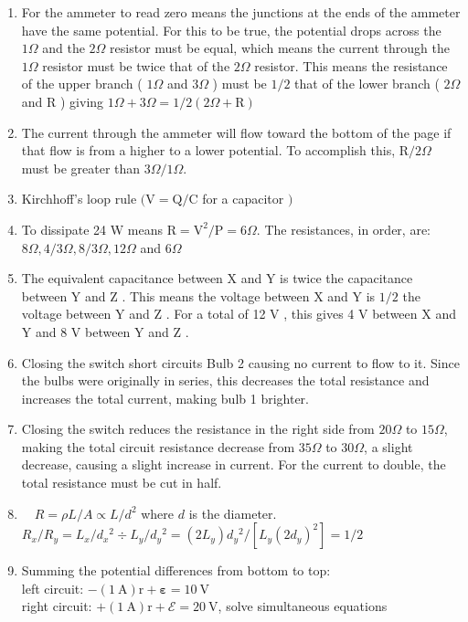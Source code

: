\begin{enumerate}
\begin{enumerate}
  \item For the ammeter to read zero means the junctions at the ends of the ammeter have the same potential. For this to be true, the potential drops across the $1 \Omega$ and the $2 \Omega$ resistor must be equal, which means the current through the $1 \Omega$ resistor must be twice that of the $2 \Omega$ resistor. This means the resistance of the upper branch ( $1 \Omega$ and $3 \Omega$ ) must be $1 / 2$ that of the lower branch ( $2 \Omega$ and R ) giving $1 \Omega+3 \Omega=1 / 2(2 \Omega+\mathrm{R})$
  \item The current through the ammeter will flow toward the bottom of the page if that flow is from a higher to a lower potential. To accomplish this, $\mathrm{R} / 2 \Omega$ must be greater than $3 \Omega / 1 \Omega$.
  \item Kirchhoff's loop rule $(\mathrm{V}=\mathrm{Q} / \mathrm{C}$ for a capacitor $)$
  \item To dissipate 24 W means $\mathrm{R}=\mathrm{V}^{2} / \mathrm{P}=6 \Omega$. The resistances, in order, are: $8 \Omega, 4 / 3 \Omega, 8 / 3 \Omega, 12 \Omega$ and $6 \Omega$
  \item The equivalent capacitance between X and Y is twice the capacitance between Y and Z . This means the voltage between X and Y is $1 / 2$ the voltage between Y and Z . For a total of 12 V , this gives 4 V between X and Y and 8 V between Y and Z .
  \item Closing the switch short circuits Bulb 2 causing no current to flow to it. Since the bulbs were originally in series, this decreases the total resistance and increases the total current, making bulb 1 brighter.
  \item Closing the switch reduces the resistance in the right side from $20 \Omega$ to $15 \Omega$, making the total circuit resistance decrease from $35 \Omega$ to $30 \Omega$, a slight decrease, causing a slight increase in current. For the current to double, the total resistance must be cut in half.
  \item $\quad R=\rho L / A \propto L / d^{2}$ where $d$ is the diameter. $R_{x} / R_{y}=L_{x} / d_{x}{ }^{2} \div L_{y} / d_{y}{ }^{2}=\left(2 L_{y}\right) d_{y}{ }^{2} /\left[L_{y}\left(2 d_{y}\right)^{2}\right]=1 / 2$
  \item Summing the potential differences from bottom to top:\\
left circuit: $-(1 \mathrm{~A}) \mathrm{r}+\boldsymbol{\varepsilon}=10 \mathrm{~V}$\\
right circuit: $+(1 \mathrm{~A}) \mathrm{r}+\boldsymbol{\mathcal { E }}=20 \mathrm{~V}$, solve simultaneous equations

\end{enumerate}
\end{enumerate}
